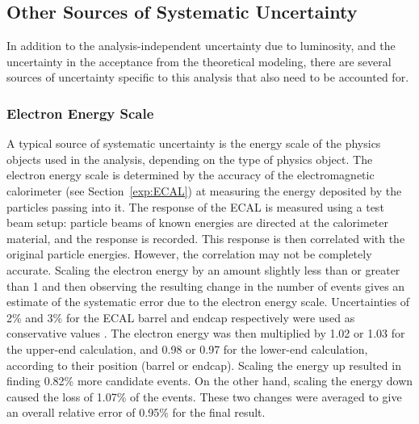 \subsection{Other Sources of Systematic Uncertainty}
\label{anMeth:SystsOther}


In addition to the analysis-independent 
uncertainty due to luminosity, 
and the uncertainty in the acceptance 
from the theoretical modeling, 
there are several sources of 
uncertainty specific to this analysis 
that also need to be accounted for.  

\subsubsection{Electron Energy Scale}
\label{anMeth:SystsOtherEleEScale}


A typical source of systematic uncertainty 
is the energy scale of the physics objects 
used in the analysis, 
depending on the type of physics object.  
The electron energy scale is determined 
by the accuracy of the electromagnetic 
calorimeter (see Section~\ref{exp:ECAL})
at measuring the energy 
deposited by the particles passing into it.  
The response of the ECAL is measured 
using a test beam setup: 
particle beams of known energies are 
directed at the calorimeter material, 
and the response is recorded.  
This response is then correlated with the 
original particle energies.  
However, the correlation may not be completely 
accurate.  
Scaling the electron energy by an amount 
slightly less than or greater than 1 
and then observing the resulting change 
in the number of \Zee events 
gives an estimate of the systematic error 
due to the electron energy scale.  
Uncertainties of 2\% and 3\% %
for the ECAL barrel and endcap respectively 
were used as conservative values \cite{CMS-PAS-EGM-10-003}.  
The electron energy was then multiplied 
by 1.02 or 1.03 for the upper-end calculation, 
and 0.98 or 0.97 for the lower-end calculation, 
according to their position (barrel or endcap).  
Scaling the energy up resulted in finding 
0.82\% more \Zee candidate events.  
On the other hand, scaling the energy down 
caused the loss of 1.07\% of the events.  
These two changes were averaged 
to give an overall relative error 
of 0.95\% for the final result.  


